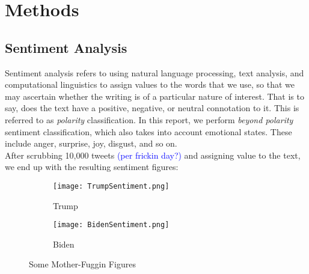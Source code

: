 \documentclass[11pt, oneside]{article}
\begin{document}


\section{Methods}
\subsection{Sentiment Analysis}
Sentiment analysis refers to using natural language processing, text analysis, and computational linguistics to assign values to the words that we use, so that we may ascertain whether the writing is of a particular nature of interest. That is to say, does the text have a positive, negative, or neutral connotation to it. This is referred to as \emph{polarity} classification. In this report, we perform \emph{beyond polarity} sentiment classification, which also takes into account emotional states. These include anger, surprise, joy, disgust, and so on. \\

After scrubbing 10,000 tweets \textcolor{blue}{(per frickin day?)} and assigning value to the text, we end up with the resulting sentiment figures:\\

\begin{figure}[H]
\centering
\begin{subfigure}{.5\textwidth}
  \centering
  \texttt{[image: TrumpSentiment.png]}
  \caption{Trump}
  \label{Trump}
\end{subfigure}%
\begin{subfigure}{.5\textwidth}
  \centering
  \texttt{[image: BidenSentiment.png]}
  \caption{Biden}
  \label{Biden}
\end{subfigure}
\caption{Some Mother-Fuggin Figures}
\label{fig:test}
\end{figure}
\end{document}
